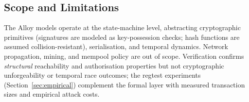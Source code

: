 \subsection{Scope and Limitations}

The Alloy models operate at the state-machine level, abstracting
cryptographic primitives (signatures are modeled as key-possession
checks; hash functions are assumed collision-resistant),
serialisation, and temporal dynamics. Network propagation, mining,
and mempool policy are out of scope. Verification confirms
\emph{structural} reachability and authorisation properties but
not cryptographic unforgeability or temporal race outcomes; the
regtest experiments (Section~\ref{sec:empirical}) complement the
formal layer with measured transaction sizes and empirical attack
costs.

\providecommand{\todo}[2][]{\textbf{[TODO: #2]}}
